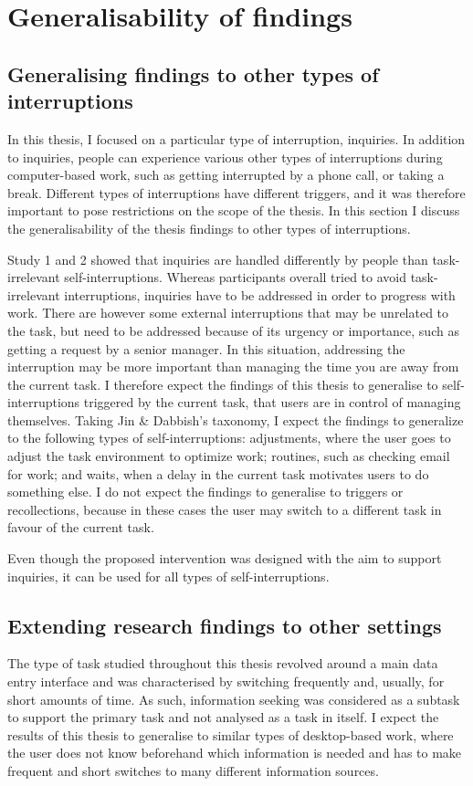 \section{Generalisability of findings}

\subsection{Generalising findings to other types of interruptions}
In this thesis, I focused on a particular type of interruption, inquiries. In addition to inquiries, people can experience various other types of interruptions during computer-based work, such as getting interrupted by a phone call, or taking a break. Different types of interruptions have different triggers, and it was therefore important to pose restrictions on the scope of the thesis. In this section I discuss the generalisability of the thesis findings to other types of interruptions. 

Study 1 and 2 showed that inquiries are handled differently by people than task-irrelevant self-interruptions. Whereas participants overall tried to avoid task-irrelevant interruptions, inquiries have to be addressed in order to progress with work. There are however some external interruptions that may be unrelated to the task, but need to be addressed because of its urgency or importance, such as getting a request by a senior manager. In this situation, addressing the interruption may be more important than managing the time you are away from the current task. I therefore expect the findings of this thesis to generalise to self-interruptions triggered by the current task, that users are in control of managing themselves. Taking Jin \& Dabbish’s taxonomy, I expect the findings to generalize to the following types of self-interruptions: adjustments, where the user goes to adjust the task environment to optimize work; routines, such as checking email for work; and waits, when a delay in the current task motivates users to do something else. I do not expect the findings to generalise to triggers or recollections, because in these cases the user may switch to a different task in favour of the current task.

Even though the proposed intervention was designed with the aim to support inquiries, it can be used for all types of self-interruptions. 

\subsection{Extending research findings to other settings}
The type of task studied throughout this thesis revolved around a main data entry interface and was characterised by switching frequently and, usually, for short amounts of time. As such, information seeking was considered as a subtask to support the primary task and not analysed as a task in itself. 
I expect the results of this thesis to generalise to similar types of desktop-based work, where the user does not know beforehand which information is needed and has to make frequent and short switches to many different information sources. 

